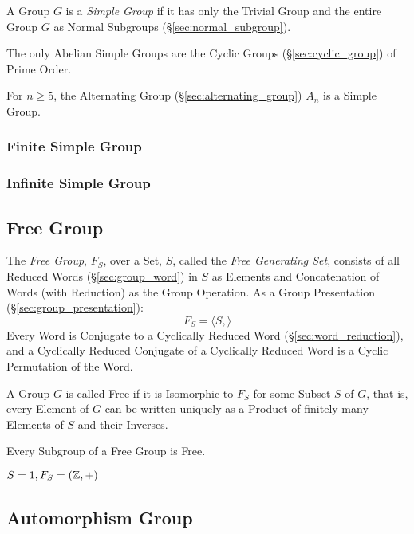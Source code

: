 A Group $G$ is a \emph{Simple Group} if it has only the Trivial Group
and the entire Group $G$ as Normal Subgroups
(\S\ref{sec:normal_subgroup}).

The only Abelian Simple Groups are the Cyclic Groups
(\S\ref{sec:cyclic_group}) of Prime Order.

For $n \geq 5$, the Alternating Group (\S\ref{sec:alternating_group})
$A_n$ is a Simple Group.



\subsubsection{Finite Simple Group}\label{sec:finite_simple_group}

\subsubsection{Infinite Simple Group}\label{sec:infinite_simple_group}



\subsection{Free Group}\label{sec:free_group}

The \emph{Free Group}, $F_S$, over a Set, $S$, called the \emph{Free
  Generating Set}, consists of all Reduced Words
(\S\ref{sec:group_word}) in $S$ as Elements and Concatenation of Words
(with Reduction) as the Group Operation. As a Group Presentation
(\S\ref{sec:group_presentation}):
\[
    F_S = \langle S, \rangle
\]
Every Word is Conjugate to a Cyclically Reduced Word
(\S\ref{sec:word_reduction}), and a Cyclically Reduced Conjugate of a
Cyclically Reduced Word is a Cyclic Permutation of the Word.

A Group $G$ is called Free if it is Isomorphic to $F_S$ for some
Subset $S$ of $G$, that is, every Element of $G$ can be written
uniquely as a Product of finitely many Elements of $S$ and their
Inverses.

Every Subgroup of a Free Group is Free. \cite{hatcher02}

$S = {1}, F_S = (\mathbb{Z},+)$



\subsection{Automorphism Group}\label{sec:automorphism_group}

